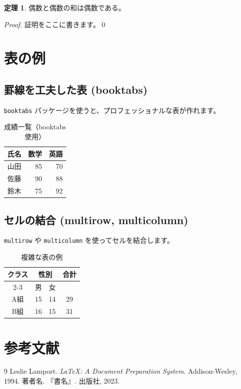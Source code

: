 \documentclass{ltjsarticle}
\theoremstyle{definition}
\newtheorem{theorem}{定理}
\begin{document}
\begin{theorem}
  偶数と偶数の和は偶数である。
\end{theorem}

\begin{proof}
  証明をここに書きます。\qed
\end{proof}

\section{表の例}

\subsection{罫線を工夫した表 (booktabs)}
\texttt{booktabs} パッケージを使うと、プロフェッショナルな表が作れます。

\begin{table}[htbp]
  \centering
  \caption{成績一覧（booktabs使用）}
  \begin{tabular}{lrr} \toprule
    氏名 & 数学 & 英語 \\ \midrule
    山田 & 85 & 70 \\
    佐藤 & 90 & 88 \\
    鈴木 & 75 & 92 \\ \bottomrule
  \end{tabular}
\end{table}

\subsection{セルの結合 (multirow, multicolumn)}
\texttt{multirow} や \texttt{multicolumn} を使ってセルを結合します。

\begin{table}[htbp]
  \centering
  \caption{複雑な表の例}
  \begin{tabular}{|c|c|c|c|} \hline
    \multirow{2}{*}{クラス} & \multicolumn{2}{c|}{性別} & \multirow{2}{*}{合計} \\ \cline{2-3}
     & 男 & 女 & \\ \hline
    A組 & 15 & 14 & 29 \\ \hline
    B組 & 16 & 15 & 31 \\ \hline
  \end{tabular}
\end{table}

\section{参考文献}
\begin{thebibliography}{9}
   Leslie Lamport. \textit{\LaTeX: A Document Preparation System}. Addison-Wesley, 1994.
   著者名. 『書名』. 出版社, 2023.
\end{thebibliography}
\end{document}
